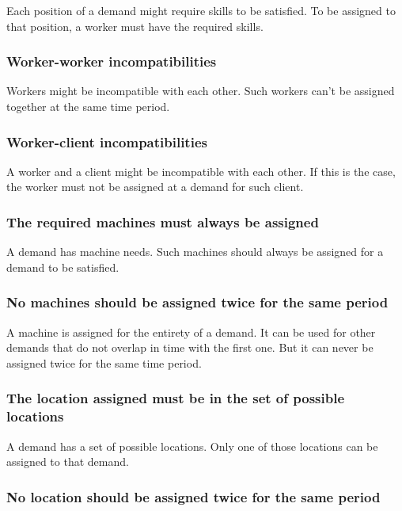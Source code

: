 \documentclass[../thesis.tex]{subfiles}
\begin{document}
Each position of a demand might require skills to be satisfied. 
To be assigned to that position, a worker must have the required skills.

\subsubsection{Worker-worker incompatibilities}

Workers might be incompatible with each other. Such workers can't 
be assigned together at the same time period.

\subsubsection{Worker-client incompatibilities}

A worker and a client might be incompatible with each other. 
If this is the case, the worker must not be assigned at a demand for such client.

\subsubsection{The required machines must always be assigned}

A demand has machine needs. Such machines should always be assigned 
for a demand to be satisfied.

\subsubsection{No machines should be assigned twice for the same period}

A machine is assigned for the entirety of a demand. It can be used for other demands 
that do not overlap in time with the first one. But it can never be assigned twice 
for the same time period.

\subsubsection{The location assigned must be in the set of possible locations}

A demand has a set of possible locations. Only one of those locations can be assigned 
to that demand.

\subsubsection{No location should be assigned twice for the same period}
\end{document}
